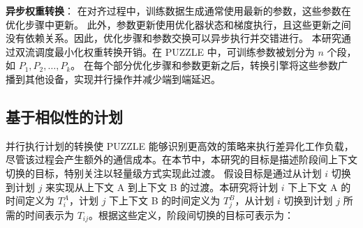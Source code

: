 





\textbf{异步权重转换}： 在对齐过程中，训练数据生成通常使用最新的参数，这些参数在优化步骤中更新。
此外，参数更新使用优化器状态和梯度执行，且这些更新之间没有依赖关系。因此，优化步骤和参数交换可以异步执行并交错进行。  
本研究通过双流调度最小化权重转换开销。在 PUZZLE 中，可训练参数被划分为 $n$ 个段，如 $P_1, P_2,\ldots,P_k$。
在每个部分优化步骤和参数更新之后，转换引擎将这些参数广播到其他设备，实现并行操作并减少端到端延迟。  


\subsection{基于相似性的计划}
\label{subsection:inter-stage-goal}

并行执行计划的转换使 PUZZLE 能够识别更高效的策略来执行差异化工作负载，尽管该过程会产生额外的通信成本。在本节中，本研究的目标是描述阶段间上下文切换的目标，特别关注以轻量级方式实现此过渡。  
假设目标是通过从计划 $i$ 切换到计划 $j$ 来实现从上下文 A 到上下文 B 的过渡。本研究将计划 $i$ 下上下文 A 的时间定义为 $T^A_i$，计划 $j$ 下上下文 B 的时间定义为 $T^B_j$，从计划 $i$ 切换到计划 $j$ 所需的时间表示为 $T_{ij}$。根据这些定义，阶段间切换的目标可表示为：  

